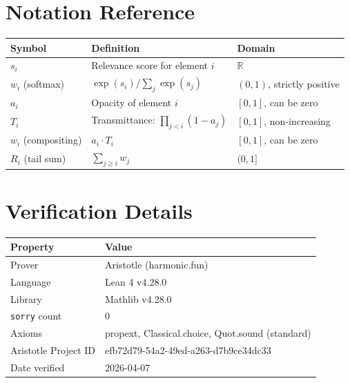 \documentclass[11pt]{article}
\begin{document}
\section{Notation Reference}
\label{app:notation}

\begin{center}
\begin{tabular}{lll}
\toprule
Symbol & Definition & Domain \\
\midrule
$s_i$ & Relevance score for element $i$ & $\mathbb{R}$ \\
$w_i$ (softmax) & $\exp(s_i) / \sum_j \exp(s_j)$ & $(0, 1)$, strictly positive \\
$a_i$ & Opacity of element $i$ & $[0, 1]$, can be zero \\
$T_i$ & Transmittance: $\prod_{j<i} (1 - a_j)$ & $[0, 1]$, non-increasing \\
$w_i$ (compositing) & $a_i \cdot T_i$ & $[0, 1]$, can be zero \\
$R_i$ (tail sum) & $\sum_{j \geq i} w_j$ & $(0, 1]$ \\
\bottomrule
\end{tabular}
\end{center}

\section{Verification Details}
\label{app:verification}

\begin{center}
\begin{tabular}{ll}
\toprule
Property & Value \\
\midrule
Prover & Aristotle (harmonic.fun) \\
Language & Lean 4 v4.28.0 \\
Library & Mathlib v4.28.0 \\
\texttt{sorry} count & 0 \\
Axioms & propext, Classical.choice, Quot.sound (standard) \\
Aristotle Project ID & efb72d79-54a2-49ed-a263-d7b9ce34dc33 \\
Date verified & 2026-04-07 \\
\bottomrule
\end{tabular}
\end{center}
\end{document}
